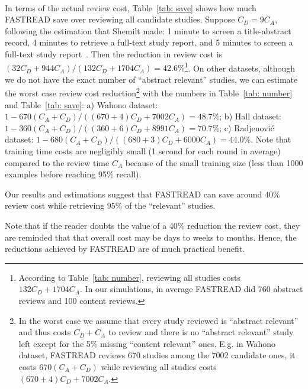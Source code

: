 \documentclass{svjour3}
\theoremstyle{break}
\newcommand{\respto}[1]{
\fcolorbox{black}{black!15}{
\label{response:#1}
\bf
  \scriptsize R-{#1}}~
}
\begin{document}
\respto{3b2}
In terms of the actual review cost,
Table~\ref{tab: save} shows how much FASTREAD save over reviewing all candidate studies. Suppose $C_D=9C_A$, following the estimation that Shemilt made: 1 minute to screen a title-abstract record, 4 minutes to retrieve a full-text study report, and 5 minutes to screen a full-text study report~\cite{shemilt2016use}. Then the reduction in review cost is $(32C_D+944C_A)/(132C_D+1704C_A) = 42.6\%$\footnote{According to Table~\ref{tab: number}, reviewing all studies costs $132C_D+1704C_A$. In our simulations, in average FASTREAD did 760 abstract reviews and 100 content reviews.}. On other datasets, although we do not have the exact number of ``abstract relevant'' studies, we can estimate the worst case review cost reduction\footnote{In the worst case we assume that every study reviewed is ``abstract relevant'' and thus costs $C_D+C_A$ to review and there is no ``abstract relevant'' study left except for the 5\% missing ``content relevant'' ones. E.g. in Wahono dataset, FASTREAD reviews 670 studies among the 7002 candidate ones, it costs $670(C_A+C_D)$ while reviewing all studies costs $(670+4)C_D+7002C_A$.} with the numbers in Table~\ref{tab: number} and Table~\ref{tab: save}: a) Wahono dataset: $1-670(C_A+C_D)/((670+4)C_D+7002C_A) = 48.7\%$; b) Hall dataset: $1-360(C_A+C_D)/((360+6)C_D+8991C_A) = 70.7\%$; c) Radjenovi{\'c} dataset: $1-680(C_A+C_D)/((680+3)C_D+6000C_A) = 44.0\%$. 
Note that training time costs are negligibly small (1 second for each round in average) compared to the review time $C_A$ because of the small training size (less than 1000 examples before reaching 95\% recall). 

\begin{lesson}
    Our results and estimations suggest that FASTREAD can save around $40\%$ review cost while retrieving $95\%$ of the ``relevant'' studies.
\end{lesson}

Note that if the reader doubts the value of a 40\% reduction the review cost, they are reminded that that overall cost may be days to weeks to months. Hence, the reductions achieved by FASTREAD are of much practical benefit.
\end{document}
